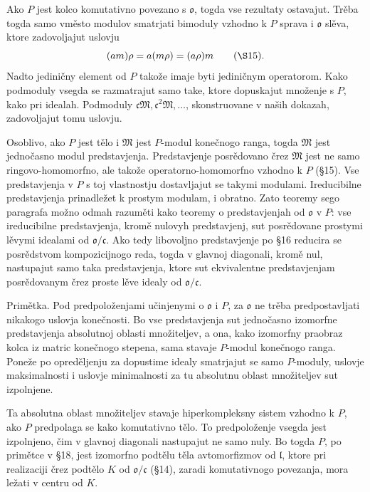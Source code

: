 \documentclass[11pt]{article}
\providecommand{\mo}{\mathfrak{o}}
\providecommand{\ml}{\mathfrak{l}}
\providecommand{\mc}{\mathfrak{c}}
\providecommand{\mM}{\mathfrak{M}}
\begin{document}
Ako $P$ jest kolco komutativno povezano s $\mo$, togda vse rezultaty ostavajut. Trěba togda samo vměsto modulov smatrjati bimoduly vzhodno k $P$ sprava i $\mo$ slěva, ktore zadovoljajut uslovju
\[
        (am)\rho=a(m\rho)=(a\rho)m \qquad(\S 15).
\]
Nadto jediničny element od $P$ takože imaje byti jediničnym operatorom. Kako podmoduly vsegda se razmatrajut samo take, ktore dopuskajut množenje s $P$, kako pri idealah. Podmoduly $\mc\mM,\mc^2\mM,\ldots$, skonstruovane v naših dokazah, zadovoljajut tomu uslovju.

Osoblivo, ako $P$ jest tělo i $\mM$ jest $P$-modul konečnogo ranga, togda $\mM$ jest jednočasno modul predstavjenja. Predstavjenje posrědovano črez $\mM$ jest ne samo ringovo-homomorfno, ale takože operatorno-homomorfno vzhodno k $P$ (§15). Vse predstavjenja v $P$ s toj vlastnostju dostavljajut se takymi modulami. Ireducibilne predstavjenja prinadležet k prostym modulam, i obratno. Zato teoremy sego paragrafa možno odmah razuměti kako teoremy o predstavjenjah od $\mo$ v $P$: vse ireducibilne predstavjenja, kromě nulovyh predstavjenj, sut posrědovane prostymi lěvymi idealami od $\mo/\mc$. Ako tedy libovoljno predstavjenje po §16 reducira se posrědstvom kompozicijnogo reda, togda v glavnoj diagonali, kromě nul, nastupajut samo taka predstavjenja, ktore sut ekvivalentne predstavjenjam posrědovanym črez proste lěve idealy od $\mo/\mc$.

Primětka. Pod predpoloženjami učinjenymi o $\mo$ i $P$, za $\mo$ ne trěba predpostavljati nikakogo uslovja konečnosti. Bo vse predstavjenja sut jednočasno izomorfne predstavjenja absolutnoj oblasti množiteljev, a ona, kako izomorfny praobraz kolca iz matric konečnogo stepena, sama stavaje $P$-modul konečnogo ranga. Poneže po opreděljenju za dopustime idealy smatrjajut se samo $P$-moduly, uslovje maksimalnosti i uslovje minimalnosti za tu absolutnu oblast množiteljev sut izpolnjene.

Ta absolutna oblast množiteljev stavaje hiperkompleksny sistem vzhodno k $P$, ako $P$ predpolaga se kako komutativno tělo. To predpoloženje vsegda jest izpolnjeno, čim v glavnoj diagonali nastupajut ne samo nuly. Bo togda $P$, po primětce v §18, jest izomorfno podtělu těla avtomorfizmov od $\ml$, ktore pri realizaciji črez podtělo $K$ od $\mo/\mc$ (§14), zaradi komutativnogo povezanja, mora ležati v centru od $K$.
\end{document}
